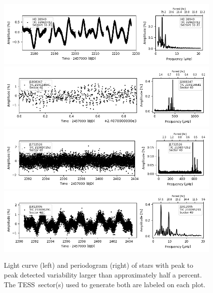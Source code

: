 \documentclass[twocolumn]{aastex631}
\newcommand{\tess}{TESS}
\begin{document}
\begin{figure}
    \centering
    \includegraphics[width=0.9\linewidth]{figures/tic00000032869782_s323_norm1.fits.png}
    \includegraphics[width=0.9\linewidth]{figures/tic00000219114641_s040_flat2.fits.png}
    \includegraphics[width=0.9\linewidth]{figures/tic00000219897252_s040_norm1.fits.png}
    \includegraphics[width=0.9\linewidth]{figures/tic00000233095291_s040_flat1.fits.png}
    \caption{Light curve (left) and periodogram (right) of stars with peak to peak detected variability larger than approximately half a percent. The \tess\ sector(s) used to generate both are labeled on each plot.}
    \label{fig:lcft1}
\end{figure}
\end{document}
